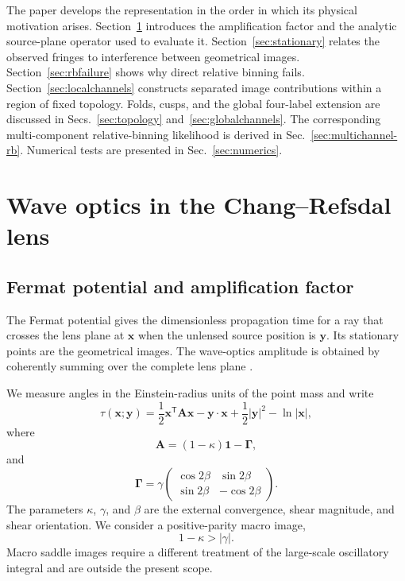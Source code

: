 \documentclass[aps,prd,twocolumn,nofootinbib,superscriptaddress,floatfix]{revtex4-2}
\newcommand{\bx}{\bm{x}}
\newcommand{\by}{\bm{y}}
\newcommand{\bA}{\bm{A}}
\newcommand{\bG}{\bm{\Gamma}}
\begin{document}
The paper develops the representation in the order in which its physical
motivation arises.  Section~\ref{sec:waveoptics} introduces the amplification
factor and the analytic source-plane operator used to evaluate it.
Section~\ref{sec:stationary} relates the observed fringes to interference
between geometrical images.  Section~\ref{sec:rbfailure} shows why direct
relative binning fails.  Section~\ref{sec:localchannels} constructs separated
image contributions within a region of fixed topology.  Folds, cusps, and the
global four-label extension are discussed in
Secs.~\ref{sec:topology} and~\ref{sec:globalchannels}.  The corresponding
multi-component relative-binning likelihood is derived in
Sec.~\ref{sec:multichannel-rb}.  Numerical tests are presented in
Sec.~\ref{sec:numerics}.

\section{Wave optics in the Chang--Refsdal lens}
\label{sec:waveoptics}

\subsection{Fermat potential and amplification factor}

The Fermat potential gives the dimensionless propagation time for a ray that
crosses the lens plane at $\bx$ when the unlensed source position is $\by$.
Its stationary points are the geometrical images.  The wave-optics amplitude is
obtained by coherently summing over the complete lens plane
\cite{SchneiderEhlersFalco1992,NakamuraDeguchi1999}.

We measure angles in the Einstein-radius units of the point mass and write
\begin{equation}
 \tau(\bx;\by)
 =\frac12\bx^{\mathsf T}\bA\bx-\by\mathbin{\cdot}\bx
  +\frac12|\by|^2-\ln|\bx|,
 \label{eq:fermat}
\end{equation}
where
\begin{equation}
 \bA=(1-\kappa)\bm{1}-\bG,
 \label{eq:macro-matrix}
\end{equation}
and
\begin{equation}
 \bG=\gamma
 \begin{pmatrix}
  \cos 2\beta & \sin 2\beta\\
  \sin 2\beta & -\cos 2\beta
 \end{pmatrix}.
 \label{eq:shear-matrix}
\end{equation}
The parameters $\kappa$, $\gamma$, and $\beta$ are the external convergence,
shear magnitude, and shear orientation.  We consider a positive-parity macro
image,
\begin{equation}
 1-\kappa>|\gamma|.
 \label{eq:positive-parity}
\end{equation}
Macro saddle images require a different treatment of the large-scale
oscillatory integral and are outside the present scope.
\end{document}
